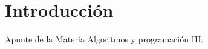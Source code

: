\documentclass[../main.tex]{subfiles}
\begin{document}
    \section{Introducción} 
        Apunte de la Materia Algoritmos y programación III.
\end{document}

